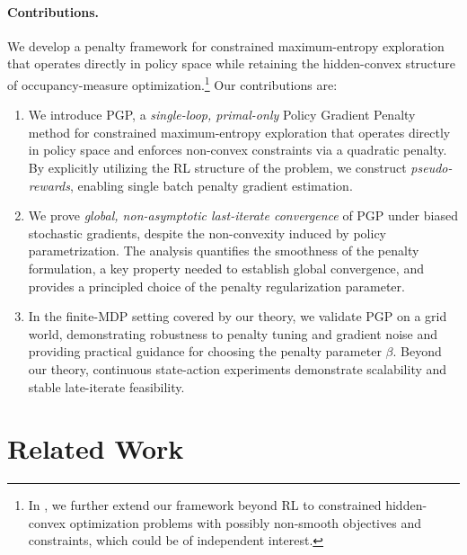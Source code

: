 \documentclass{article}
\theoremstyle{plain}
\theoremstyle{definition}
\theoremstyle{remark}
\newcommand{\algo}{PGP}
\begin{document}
\paragraph{Contributions.} We develop a penalty framework for constrained maximum-entropy exploration
that operates directly in policy space while retaining the hidden-convex
structure of occupancy-measure optimization.\footnote{ In
 , we further extend our
 framework beyond RL to constrained hidden-convex optimization problems with
 possibly non-smooth objectives and constraints, which could be of
 independent interest.} Our contributions are:
\begin{enumerate}[start=1,label={(\bfseries C\arabic*)}]
 \item We introduce \algo{}, a \emph{single-loop, primal-only} Policy Gradient
       Penalty method for constrained maximum-entropy exploration that operates
       directly in policy space and enforces non-convex constraints via a
       quadratic penalty. By explicitly utilizing the RL structure of the problem,
       we construct \emph{pseudo-rewards}, enabling single batch penalty gradient
       estimation.
 \item We prove \emph{global, non-asymptotic last-iterate convergence} of \algo{}
       under biased stochastic gradients, despite the non-convexity induced by
       policy parametrization. The analysis quantifies the smoothness of the
       penalty formulation, a key property needed to establish global convergence,
       and provides a principled choice of the penalty regularization parameter.
 \item In the finite-MDP setting covered by our theory, we validate PGP on a grid
       world, demonstrating robustness to penalty tuning and gradient noise and
       providing practical guidance for choosing the penalty parameter $\beta$.
       Beyond our theory, continuous state-action experiments demonstrate
       scalability and stable late-iterate feasibility.
\end{enumerate}

\section{Related Work}
\end{document}
